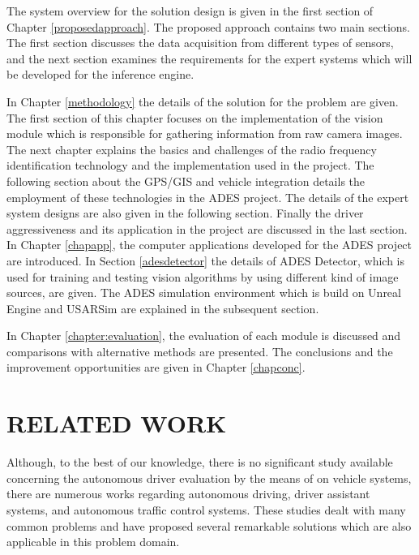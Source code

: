 \documentclass[a4paper,oneside,12pt]{report}
\begin{document}
The system overview for the solution design is given in the first section of Chapter \ref{proposedapproach}. The proposed approach contains two main sections. The first section discusses the data acquisition from different types of sensors, and the next section examines the requirements for the expert systems which will be developed for the inference engine.

In Chapter \ref{methodology} the details of the solution for the problem are given. The first section of this chapter focuses on the implementation of the vision module which is responsible for gathering information from raw camera images. The next chapter explains the basics and challenges of the radio frequency identification technology and the implementation used in the project. The following section about the GPS/GIS and vehicle integration details the employment of these technologies in the ADES project. The details of the expert system designs are also given in the following section. Finally the driver aggressiveness and its application in the project are discussed in the last section. In Chapter \ref{chapapp}, the computer applications developed for the ADES project are introduced. In Section \ref{adesdetector} the details of ADES Detector, which is used for training and testing vision algorithms by using different kind of image sources, are given. The ADES simulation environment which is build on Unreal Engine and USARSim are explained in the subsequent section.

In Chapter \ref{chapter:evaluation}, the evaluation of each module is discussed and comparisons with alternative methods are presented. The conclusions and the improvement opportunities are given in Chapter \ref{chapconc}.

\chapter{RELATED WORK}
\label{relwork}
Although, to the best of our knowledge, there is no significant study available concerning the autonomous driver evaluation by the means of on vehicle systems, there are numerous works regarding autonomous driving, driver assistant systems, and autonomous traffic control systems. These studies dealt with many common problems and have proposed several remarkable solutions which are also applicable in this problem domain. 
\end{document}
